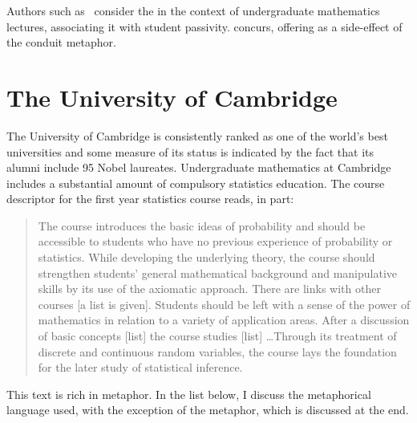 Authors such as~ consider the  in the context of undergraduate mathematics lectures,
associating it with student passivity.  
concurs, offering  as a side-effect of the conduit metaphor.

\section{The University of Cambridge}

The University of Cambridge is consistently ranked as one of the
world's best universities and some measure of its status is indicated
by the fact that its alumni include 95 Nobel laureates.  Undergraduate
mathematics at Cambridge includes a substantial amount of compulsory
statistics education.  The course descriptor for the first year
statistics course reads, in part:

\begin{singlespace}
\begin{quote}
The course introduces the basic ideas of probability and should be
accessible to students who have no previous experience of probability
or statistics.  While developing the underlying theory, the course
should strengthen students' general mathematical background and
manipulative skills by its use of the axiomatic approach.  There are
links with other courses [a list is given].  Students should be left
with a sense of the power of mathematics in relation to a variety of
application areas.  After a discussion of basic concepts [list] the
course studies [list] \ldots Through its treatment of discrete and
continuous random variables, the course lays the foundation for the
later study of statistical inference.
\end{quote}
\end{singlespace}

\noindent
This text is rich in metaphor.   In the list below, I discuss the
metaphorical language used, with the exception of the
 metaphor, which is discussed at the end.

